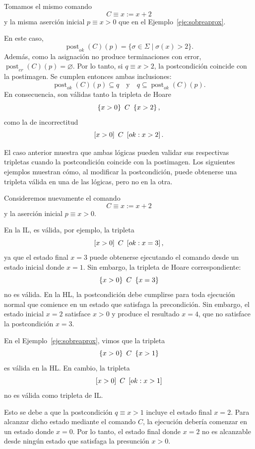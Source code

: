 \documentclass[a4paper,	11pt]{report}
\begin{document}
\begin{ejemplo}
\label{eje:comp-HL-IL0}
Tomamos el mismo comando
$$C \equiv x := x + 2$$
y la misma aserción inicial $p \equiv x > 0$ que en el Ejemplo~\ref{eje:sobreaprox}.

En este caso,
$$\operatorname{post}_{ok}(C)(p) = \{\sigma \in \Sigma \mid \sigma(x) > 2\}.$$
Además, como la asignación no produce terminaciones con error,
$\operatorname{post}_{er}(C)(p) = \varnothing.$
Por lo tanto, si $q \equiv x > 2$,
la postcondición coincide con la postimagen.
Se cumplen entonces ambas inclusiones:
$$\operatorname{post}_{ok}(C)(p) \subseteq q \quad \text{y} \quad q \subseteq \operatorname{post}_{ok}(C)(p).$$
En consecuencia, son válidas tanto la tripleta de Hoare
$$\left\{ x > 0 \right\}~C~\left\{ x > 2 \right\},$$
como la de incorrectitud
$$\left\lbrack x > 0 \right\rbrack~C~\left\lbrack ok : x > 2 \right\rbrack.$$
\end{ejemplo}

El caso anterior muestra que ambas lógicas pueden validar sus respectivas tripletas
cuando la postcondición coincide con la postimagen.
Los siguientes ejemplos muestran cómo,
al modificar la postcondición,
puede obtenerse una tripleta válida en una de las lógicas,
pero no en la otra.

\begin{ejemplo}
\label{eje:comp-HL-IL}
Consideremos nuevamente el comando
$$C \equiv x := x + 2$$
y la aserción inicial $p \equiv x > 0$.

En la IL, es válida, por ejemplo, la tripleta
$$\left\lbrack x > 0 \right\rbrack~C~\left\lbrack ok : x = 3 \right\rbrack,$$
ya que el estado final $x = 3$ puede obtenerse ejecutando el comando desde un estado inicial donde $x = 1$.
Sin embargo, la tripleta de Hoare correspondiente:
$$\left\{ x > 0 \right\}~C~\left\{ x = 3 \right\}$$
no es válida.
En la HL, la postcondición debe cumplirse para toda ejecución normal que comience en un estado que satisfaga la precondición.
Sin embargo, el estado inicial $x = 2$ satisface $x > 0$ y produce el resultado $x = 4$,
que no satisface la postcondición $x = 3$.
\end{ejemplo}

\begin{ejemplo}
\label{eje:comp-HL-IL2}
En el Ejemplo~\ref{eje:sobreaprox}, vimos que la tripleta
$$\left\{ x > 0 \right\}~C~\left\{ x > 1 \right\}$$
es válida en la HL.
En cambio, la tripleta
$$\left\lbrack x > 0 \right\rbrack~C~\left\lbrack ok : x > 1 \right\rbrack$$
no es válida como tripleta de IL.

Esto se debe a que la postcondición $q \equiv x > 1$ incluye el estado final $x = 2$.
Para alcanzar dicho estado mediante el comando $C$, la ejecución debería comenzar en un estado donde $x = 0$.
Por lo tanto,
el estado final donde $x = 2$ no es alcanzable desde ningún estado que satisfaga la presunción $x > 0$.
\end{ejemplo}
\end{document}
